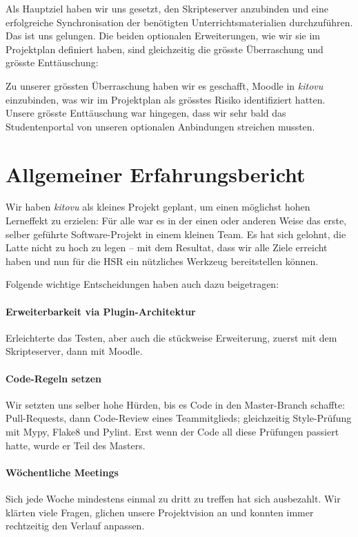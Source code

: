 \documentclass[a4paper]{article}
\let\oldsection\section
\renewcommand\section{\clearpage\oldsection}
\begin{document}
Als Hauptziel haben wir uns gesetzt, den Skripteserver anzubinden und eine erfolgreiche Synchronisation der benötigten Unterrichtsmaterialien durchzuführen. Das ist uns gelungen. Die beiden optionalen Erweiterungen, wie wir sie im Projektplan definiert haben, sind gleichzeitig die grösste Überraschung und grösste Enttäuschung:

Zu unserer grössten Überraschung haben wir es geschafft, Moodle in \emph{kitovu} einzubinden, was wir im Projektplan als grösstes Risiko identifiziert hatten. Unsere grösste Enttäuschung war hingegen, dass wir sehr bald das Studentenportal von unseren optionalen Anbindungen streichen mussten.

\section{Allgemeiner Erfahrungsbericht}

Wir haben \emph{kitovu} als kleines Projekt geplant, um einen möglichst hohen Lerneffekt zu erzielen: Für alle war es in der einen oder anderen Weise das erste, selber geführte Software-Projekt in einem kleinen Team. Es hat sich gelohnt, die Latte nicht zu hoch zu legen -- mit dem Resultat, dass wir alle Ziele erreicht haben und nun für die HSR ein nützliches Werkzeug bereitstellen können.

Folgende wichtige Entscheidungen haben auch dazu beigetragen:

\paragraph{Erweiterbarkeit via Plugin-Architektur}
 Erleichterte das Testen, aber auch die stückweise Erweiterung, zuerst mit dem Skripteserver, dann mit Moodle.

\paragraph{Code-Regeln setzen}
 Wir setzten uns selber hohe Hürden, bis es Code in den Master-Branch schaffte: Pull-Requests, dann Code-Review eines Teammitglieds; gleichzeitig  Style-Prüfung mit Mypy, Flake8 und Pylint. Erst wenn der Code all diese Prüfungen passiert hatte, wurde er Teil des Masters.

\paragraph{Wöchentliche Meetings} Sich jede Woche mindestens einmal zu dritt zu treffen hat sich ausbezahlt. Wir klärten viele Fragen, glichen unsere Projektvision an und konnten immer rechtzeitig den Verlauf anpassen.
\end{document}
